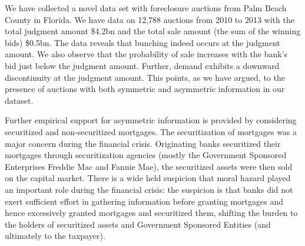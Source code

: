 \documentclass[11pt,twopage]{article}
\begin{document}

We have collected a novel data set with foreclosure auctions from
Palm Beach County in Florida. We have data on 12,788 auctions from
2010 to 2013 with the
total judgment amount \$4.2bn and the total sale amount (the sum of the winning bids) 
\$0.5bn. The data reveals that bunching indeed occurs
at the judgment amount. We also observe that the probability of sale
increases with the bank's bid just below the judgment amount. Further, demand exhibits a downward discontinuity at the judgment amount. This points, as we have argued, to the presence of auctions with both symmetric and asymmetric information in our dataset.


Further empirical support for asymmetric information is provided by considering securitized and non-securitized mortgages. 
%
The securitization of mortgages was a major concern during the financial crisis.
Originating banks securitized their mortgages through
securitization agencies (mostly the Government Sponsored Enterprises
Freddie Mac and Fannie Mae), the securitized assets were then sold on
the capital market. There is a wide held suspicion that moral hazard played an important role during the financial crisis: the suspicion is that banks did not exert sufficient effort in gathering information before granting mortgages and hence excessively
granted mortgages and securitized them, shifting
the burden to the holders of securitized assets and Government
Sponsored Entities (and ultimately to the taxpayer). 
\end{document}

